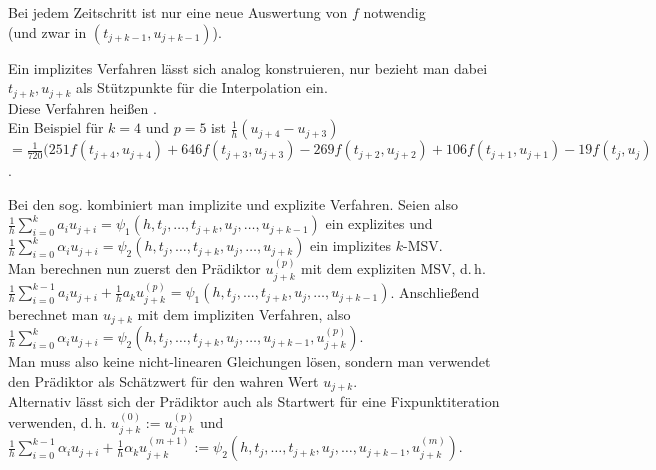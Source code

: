 \begin{Bem}
    Bei jedem Zeitschritt ist nur eine neue Auswertung von $f$ notwendig\\
    (und zwar in $(t_{j+k-1}, u_{j+k-1})$).
\end{Bem}

\begin{Bsp}
    Ein implizites Verfahren lässt sich analog konstruieren, nur bezieht man
    dabei\\
    $t_{j+k}, u_{j+k}$ als Stützpunkte für die Interpolation ein.\\
    Diese Verfahren heißen .\\
    Ein Beispiel für $k = 4$ und $p = 5$ ist
    $\frac{1}{h} (u_{j+4} - u_{j+3})$\\
    $= \frac{1}{720} (251 f(t_{j+4}, u_{j+4}) + 646 f(t_{j+3}, u_{j+3})
    - 269 f(t_{j+2}, u_{j+2}) + 106 f(t_{j+1}, u_{j+1}) - 19 f(t_j, u_j)$.
\end{Bsp}

\linie
\pagebreak

\begin{Bem}
    Bei den sog.  kombiniert man
    implizite und explizite Verfahren.
    Seien also $\frac{1}{h} \sum_{i=0}^k a_i u_{j+i} =
    \psi_1(h, t_j, \dotsc, t_{j+k}, u_j, \dotsc, u_{j+k-1})$ ein explizites und
    $\frac{1}{h} \sum_{i=0}^k \alpha_i u_{j+i} =
    \psi_2(h, t_j, \dotsc, t_{j+k}, u_j, \dotsc, u_{j+k})$ ein implizites
    $k$-MSV.\\
    Man berechnen nun zuerst den Prädiktor $u_{j+k}^{(p)}$ mit dem expliziten
    MSV, d.\,h.\\
    $\frac{1}{h} \sum_{i=0}^{k-1} a_i u_{j+i} +
    \frac{1}{h} a_k u_{j+k}^{(p)} =
    \psi_1(h, t_j, \dotsc, t_{j+k}, u_j, \dotsc, u_{j+k-1})$.
    Anschließend berechnet man $u_{j+k}$ mit dem impliziten Verfahren, also
    $\frac{1}{h} \sum_{i=0}^k \alpha_i u_{j+i} =
    \psi_2(h, t_j, \dotsc, t_{j+k}, u_j, \dotsc, u_{j+k-1}, u_{j+k}^{(p)})$.\\
    Man muss also keine nicht-linearen Gleichungen lösen, sondern man verwendet
    den Prädiktor als Schätzwert für den wahren Wert $u_{j+k}$.\\
    Alternativ lässt sich der Prädiktor auch als Startwert für eine
    Fixpunktiteration verwenden, d.\,h. $u_{j+k}^{(0)} := u_{j+k}^{(p)}$ und
    $\frac{1}{h} \sum_{i=0}^{k-1} \alpha_i u_{j+i} +
    \frac{1}{h} \alpha_k u_{j+k}^{(m+1)} :=
    \psi_2(h, t_j, \dotsc, t_{j+k}, u_j, \dotsc, u_{j+k-1}, u_{j+k}^{(m)})$.
\end{Bem}

